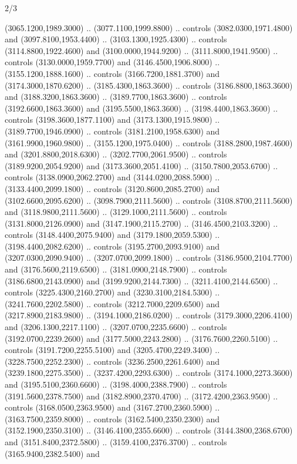\begin{flagdescription}{2/3}
\begin{scope}[shift={(0.5\flaglength,0.5)},scale=\flagwidth/130]
\begin{scope}[y=0.01mm, x=0.01mm,shift={(-3365,-2250)}]
  (3065.1200,1989.3000) .. (3077.1100,1999.8800) .. controls
  (3082.0300,1971.4800) and (3097.8100,1953.4400) .. (3103.1300,1925.4300) ..
  controls (3114.8800,1922.4600) and (3100.0000,1944.9200) ..
  (3111.8000,1941.9500) .. controls (3130.0000,1959.7700) and
  (3146.4500,1906.8000) .. (3155.1200,1888.1600) .. controls
  (3166.7200,1881.3700) and (3174.3000,1870.6200) .. (3185.4300,1863.3600) ..
  controls (3186.8800,1863.3600) and (3188.3200,1863.3600) ..
  (3189.7700,1863.3600) .. controls (3192.6600,1863.3600) and
  (3195.5500,1863.3600) .. (3198.4400,1863.3600) .. controls
  (3198.3600,1877.1100) and (3173.1300,1915.9800) .. (3189.7700,1946.0900) ..
  controls (3181.2100,1958.6300) and (3161.9900,1960.9800) ..
  (3155.1200,1975.0400) .. controls (3188.2800,1987.4600) and
  (3201.8800,2018.6300) .. (3202.7700,2061.9500) .. controls
  (3189.9200,2054.9200) and (3173.3600,2051.4100) .. (3150.7800,2053.6700) ..
  controls (3138.0900,2062.2700) and (3144.0200,2088.5900) ..
  (3133.4400,2099.1800) .. controls (3120.8600,2085.2700) and
  (3102.6600,2095.6200) .. (3098.7900,2111.5600) .. controls
  (3108.8700,2111.5600) and (3118.9800,2111.5600) .. (3129.1000,2111.5600) ..
  controls (3131.8000,2126.0900) and (3147.1900,2115.2700) ..
  (3146.4500,2103.3200) .. controls (3148.4400,2075.9400) and
  (3179.1800,2059.5300) .. (3198.4400,2082.6200) .. controls
  (3195.2700,2093.9100) and (3207.0300,2090.9400) .. (3207.0700,2099.1800) ..
  controls (3186.9500,2104.7700) and (3176.5600,2119.6500) ..
  (3181.0900,2148.7900) .. controls (3186.6800,2143.0900) and
  (3199.9200,2144.7300) .. (3211.4100,2144.6500) .. controls
  (3225.4300,2160.2700) and (3230.3100,2184.5300) .. (3241.7600,2202.5800) ..
  controls (3212.7000,2209.6500) and (3217.8900,2183.9800) ..
  (3194.1000,2186.0200) .. controls (3179.3000,2206.4100) and
  (3206.1300,2217.1100) .. (3207.0700,2235.6600) .. controls
  (3192.0700,2239.2600) and (3177.5000,2243.2800) .. (3176.7600,2260.5100) ..
  controls (3191.7200,2255.5100) and (3205.4700,2249.3400) ..
  (3228.7500,2252.2300) .. controls (3236.2500,2261.6400) and
  (3239.1800,2275.3500) .. (3237.4200,2293.6300) .. controls
  (3174.1000,2273.3600) and (3195.5100,2360.6600) .. (3198.4000,2388.7900) ..
  controls (3191.5600,2378.7500) and (3182.8900,2370.4700) ..
  (3172.4200,2363.9500) .. controls (3168.0500,2363.9500) and
  (3167.2700,2360.5900) .. (3163.7500,2359.8000) .. controls
  (3162.5400,2350.2300) and (3152.1900,2350.3100) .. (3146.4100,2355.6600) ..
  controls (3144.3800,2368.6700) and (3151.8400,2372.5800) ..
  (3159.4100,2376.3700) .. controls (3165.9400,2382.5400) and

\end{scope}
\end{scope}
\end{flagdescription}
